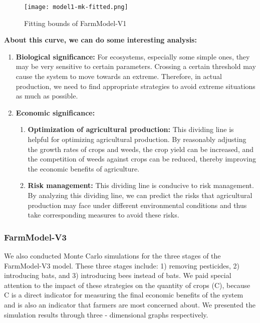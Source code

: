 \documentclass[12pt]{article}  %
\begin{document}
\begin{figure}[h]
    \centering
    \texttt{[image: model1-mk-fitted.png]}
    \caption{Fitting bounds of FarmModel-V1}
\end{figure}
\textbf{About this curve, we can do some interesting analysis:}
\begin{enumerate}
    \item \textbf{Biological significance:} For ecosystems, especially some simple ones, they may be very sensitive to certain parameters. Crossing a certain threshold may cause the system to move towards an extreme. Therefore, in actual production, we need to find appropriate strategies to avoid extreme situations as much as possible.
    \item \textbf{Economic significance:} 
    \begin{enumerate}
        \item \textbf{Optimization of agricultural production:} This dividing line is helpful for optimizing agricultural production. By reasonably adjusting the growth rates of crops and weeds, the crop yield can be increased, and the competition of weeds against crops can be reduced, thereby improving the economic benefits of agriculture.

        \item \textbf{Risk management:} This dividing line is conducive to risk management. By analyzing this dividing line, we can predict the risks that agricultural production may face under different environmental conditions and thus take corresponding measures to avoid these risks.
    \end{enumerate}
\end{enumerate}

\subsubsection{FarmModel-V3}
We also conducted Monte Carlo simulations for the three stages of the FarmModel-V3 model. These three stages include: 1) removing pesticides, 2) introducing bats, and 3) introducing bees instead of bats. We paid special attention to the impact of these strategies on the quantity of crops (C), because C is a direct indicator for measuring the final economic benefits of the system and is also an indicator that farmers are most concerned about. We presented the simulation results through three - dimensional graphs respectively.
\end{document}
